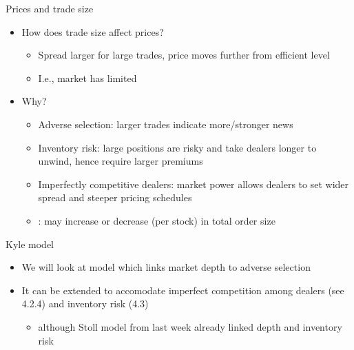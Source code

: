 \documentclass[english,10pt
,aspectratio=169
]{beamer}
\begin{document}
\begin{frame}{Prices and trade size}
	\begin{itemize}
		\item How does trade size affect prices? 
		\begin{itemize}
			\item Spread larger for large trades, price moves further from efficient level
			\item I.e., market has limited 
		\end{itemize}
		\item Why?
		\pause
		\begin{itemize}
			\item \alert{Adverse selection}: larger trades indicate more/stronger news
			\item \alert{Inventory risk}: large positions are risky and take dealers longer to unwind, hence require larger premiums
			\item \alert{Imperfectly competitive dealers}: market power allows dealers to set wider spread and steeper pricing schedules
			\pause
			\item {}: may increase or decrease (per stock) in total order size
		\end{itemize}
	\end{itemize}
\end{frame}


\begin{frame}{Kyle model}
	\begin{itemize}
		\item We will look at \cite{kyle_continuous_1985} model which links market depth to adverse selection
		\item It can be extended to accomodate imperfect competition among dealers (see 4.2.4) and inventory risk (4.3)
		\begin{itemize}
			\item although Stoll model from last week already linked depth and inventory risk
		\end{itemize}
	\end{itemize}
\end{frame}
\end{document}
